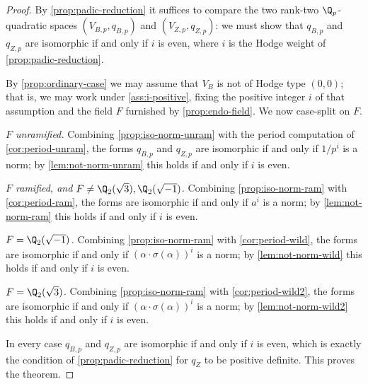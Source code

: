 \begin{proof}
  By \cref{prop:padic-reduction} it suffices to compare the two rank-two
  \(\Q_p\)-quadratic spaces \((V_{B,p}, q_{B,p})\) and \((V_{Z,p}, q_{Z,p})\):
  we must show that \(q_{B,p}\) and \(q_{Z,p}\) are isomorphic if and only if
  \(i\) is even, where \(i\) is the Hodge weight of \cref{prop:padic-reduction}.

  By \cref{prop:ordinary-case} we may assume that \(V_B\) is not of Hodge type
  \((0,0)\); that is, we may work under \cref{ass:i-positive}, fixing the
  positive integer \(i\) of that assumption and the field \(F\) furnished by
  \cref{prop:endo-field}. We now case-split on \(F\).

  \emph{\(F\) unramified.} Combining \cref{prop:iso-norm-unram} with the period
  computation of \cref{cor:period-unram}, the forms \(q_{B,p}\) and \(q_{Z,p}\)
  are isomorphic if and only if \(1/p^i\) is a norm; by
  \cref{lem:not-norm-unram} this holds if and only if \(i\) is even.

  \emph{\(F\) ramified, and \(F \neq \Q_2(\sqrt{3}), \Q_2(\sqrt{-1})\).}
  Combining \cref{prop:iso-norm-ram} with \cref{cor:period-ram}, the forms are
  isomorphic if and only if \(a^i\) is a norm; by \cref{lem:not-norm-ram} this
  holds if and only if \(i\) is even.

  \emph{\(F = \Q_2(\sqrt{-1})\).} Combining \cref{prop:iso-norm-ram} with
  \cref{cor:period-wild}, the forms are isomorphic if and only if
  \((\alpha \cdot \sigma(\alpha))^i\) is a norm; by \cref{lem:not-norm-wild}
  this holds if and only if \(i\) is even.

  \emph{\(F = \Q_2(\sqrt{3})\).} Combining \cref{prop:iso-norm-ram} with
  \cref{cor:period-wild2}, the forms are isomorphic if and only if
  \((\alpha \cdot \sigma(\alpha))^i\) is a norm; by \cref{lem:not-norm-wild2}
  this holds if and only if \(i\) is even.

  In every case \(q_{B,p}\) and \(q_{Z,p}\) are isomorphic if and only if \(i\)
  is even, which is exactly the condition of \cref{prop:padic-reduction} for
  \(q_Z\) to be positive definite. This proves the theorem.
\end{proof}

